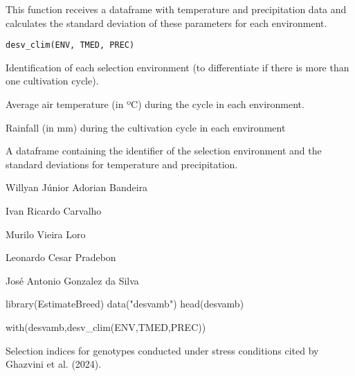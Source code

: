 \documentclass[a4paper]{book}
\begin{document}
%
\begin{Description}
This function receives a dataframe with temperature and precipitation data
and calculates the standard deviation of these parameters for each environment.
\end{Description}
%
\begin{Usage}
\begin{verbatim}
desv_clim(ENV, TMED, PREC)
\end{verbatim}
\end{Usage}
%
\begin{Arguments}
\begin{ldescription}
\item[\code{ENV}] Identification of each selection environment (to differentiate if
there is more than one cultivation cycle).

\item[\code{TMED}] Average air temperature (in ºC) during the cycle in each environment.

\item[\code{PREC}] Rainfall (in mm) during the cultivation cycle in each environment
\end{ldescription}
\end{Arguments}
%
\begin{Value}
A dataframe containing the identifier of the selection environment and
the standard deviations for temperature and precipitation.
\end{Value}
%
\begin{Author}
Willyan Júnior Adorian Bandeira

Ivan Ricardo Carvalho

Murilo Vieira Loro

Leonardo Cesar Pradebon

José Antonio Gonzalez da Silva
\end{Author}
%
\begin{Examples}
\begin{ExampleCode}

library(EstimateBreed)
data("desvamb")
head(desvamb)

with(desvamb,desv_clim(ENV,TMED,PREC))

\end{ExampleCode}
\end{Examples}
%
\begin{Description}
Selection indices for genotypes conducted under stress conditions cited
by Ghazvini et al. (2024).
\end{Description}
\end{document}
